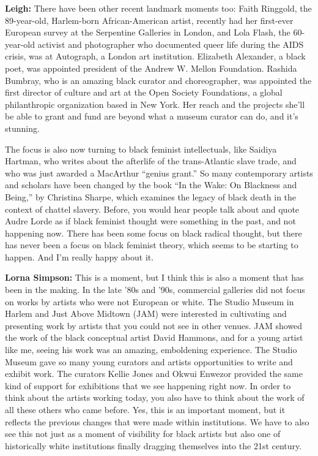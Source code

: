 \textbf{Leigh:} There have been other recent landmark moments too: Faith
Ringgold, the 89-year-old, Harlem-born African-American artist, recently
had her first-ever European survey at the Serpentine Galleries in
London, and Lola Flash, the 60-year-old activist and photographer who
documented queer life during the AIDS crisis, was at Autograph, a London
art institution. Elizabeth Alexander, a black poet, was appointed
president of the Andrew W. Mellon Foundation. Rashida Bumbray, who is an
amazing black curator and choreographer, was appointed the first
director of culture and art at the Open Society Foundations, a global
philanthropic organization based in New York. Her reach and the projects
she'll be able to grant and fund are beyond what a museum curator can
do, and it's stunning.

The focus is also now turning to black feminist intellectuals, like
Saidiya Hartman, who writes about the afterlife of the trans-Atlantic
slave trade, and who was just awarded a MacArthur ``genius grant.'' So
many contemporary artists and scholars have been changed by the book
``In the Wake: On Blackness and Being,'' by Christina Sharpe, which
examines the legacy of black death in the context of chattel slavery.
Before, you would hear people talk about and quote Audre Lorde as if
black feminist thought were something in the past, and not happening
now. There has been some focus on black radical thought, but there has
never been a focus on black feminist theory, which seems to be starting
to happen. And I'm really happy about it.

\textbf{Lorna Simpson:} This is a moment, but I think this is also a
moment that has been in the making. In the late '80s and '90s,
commercial galleries did not focus on works by artists who were not
European or white. The Studio Museum in Harlem and Just Above Midtown
(JAM) were interested in cultivating and presenting work by artists that
you could not see in other venues. JAM showed the work of the black
conceptual artist David Hammons, and for a young artist like me, seeing
his work was an amazing, emboldening experience. The Studio Museum gave
so many young curators and artists opportunities to write and exhibit
work. The curators Kellie Jones and Okwui Enwezor provided the same kind
of support for exhibitions that we see happening right now. In order to
think about the artists working today, you also have to think about the
work of all these others who came before. Yes, this is an important
moment, but it reflects the previous changes that were made within
institutions. We have to also see this not just as a moment of
visibility for black artists but also one of historically white
institutions finally dragging themselves into the 21st century.


